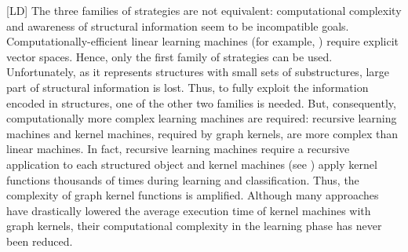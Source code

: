 \documentclass[twoside,11pt]{article}
\def\LD#1{[{\color{blue}L}D] {\color{blue}#1}}
\def\OCAR#1#2#3#4{[{\color{blue}O}{\color{brown}C}{\color{black}A}{\color{purple}R}] {\color{blue}#1} {\color{brown}#2} {\color{black}#3} {\color{purple}#4}}
\begin{document}


\LD{The three families of strategies are not equivalent: 
computational complexity and awareness of structural information seem to be incompatible goals.}
Computationally-efficient linear learning machines (for example, \cite{Joachims:2006:TLS:1150402.1150429,DBLP:journals/mp/Shalev-ShwartzSSC11,Pegasos,OLL}) require explicit vector spaces. Hence, only the first family of strategies can be used. Unfortunately, as it represents structures with small sets of substructures, large part of structural information is lost. Thus, to fully exploit the information encoded in structures, one of the other two families is needed. But, consequently, computationally more complex learning machines are required: recursive learning machines and kernel machines, 
required by graph kernels, are more complex than linear machines. In fact, recursive learning machines  require a recursive application to each structured object and kernel machines (see \cite{cristianiniSVM})
apply kernel functions thousands of times during learning and classification. Thus, the complexity of graph kernel functions is amplified. Although many approaches 
\cite{Moschitti2006,Rieck:2010:ATK:1756006.1756022,Pighin:Moschitti:conll:2010,ICML2011Shin_503}
have drastically lowered the average execution time of kernel machines with graph kernels, their computational complexity 
in the learning phase has never been reduced.

\end{document}
